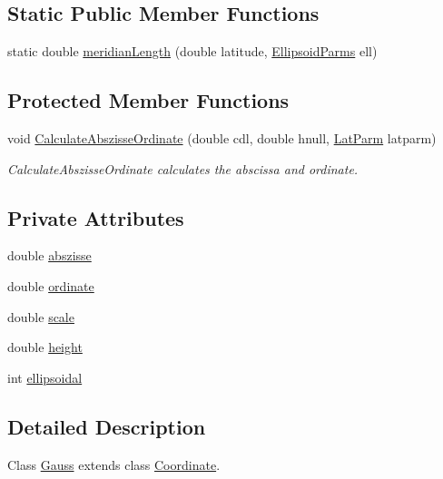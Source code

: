 \subsection*{Static Public Member Functions}
\begin{DoxyCompactItemize}
\item 
static double \hyperlink{classcoordinates_1_1_gauss_a622fa98764e45111e58a44c82f4dc5cd}{meridian\+Length} (double latitude, \hyperlink{classparams_1_1_ellipsoid_parms}{Ellipsoid\+Parms} ell)
\end{DoxyCompactItemize}
\subsection*{Protected Member Functions}
\begin{DoxyCompactItemize}
\item 
void \hyperlink{classcoordinates_1_1_gauss_a1e810f7e3af643a8c0525485d9133276}{Calculate\+Abszisse\+Ordinate} (double cdl, double hnull, \hyperlink{classparams_1_1_lat_parm}{Lat\+Parm} latparm)
\begin{DoxyCompactList}\small\item\em Calculate\+Abszisse\+Ordinate calculates the abscissa and ordinate. \end{DoxyCompactList}\end{DoxyCompactItemize}
\subsection*{Private Attributes}
\begin{DoxyCompactItemize}
\item 
double \hyperlink{classcoordinates_1_1_gauss_a9bd37a096f53a9e443570ec5748f95d8}{abszisse}
\item 
double \hyperlink{classcoordinates_1_1_gauss_ab156b1da518d7637dacef40489a0dba4}{ordinate}
\item 
double \hyperlink{classcoordinates_1_1_gauss_aea6297c71e9258a7dfb80a823048dc0d}{scale}
\item 
double \hyperlink{classcoordinates_1_1_gauss_ad1543fe8a30e7f6dab1d0486bb5a935d}{height}
\item 
int \hyperlink{classcoordinates_1_1_gauss_a08582ecf17604f8330df079ce234008c}{ellipsoidal}
\end{DoxyCompactItemize}


\subsection{Detailed Description}
Class \hyperlink{classcoordinates_1_1_gauss}{Gauss} extends class \hyperlink{classcoordinates_1_1_coordinate}{Coordinate}. 

